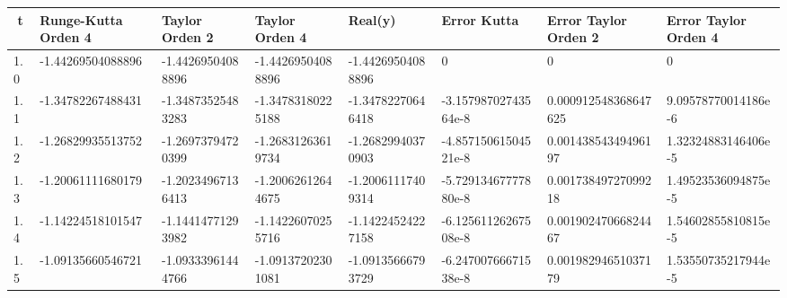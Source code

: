 \documentclass[12pt,b4paper,landscape]{memoir}
\begin{document}
\begin{table}[]

\begin{tabular}{|l|l|l|l|l|l|l|l|}
\hline

\multicolumn{1}{|c|}{\textbf{t}} & \textbf{Runge-Kutta Orden 4} & \textbf{Taylor Orden 2}                 & \textbf{Taylor Orden 4} & \textbf{Real(y)}   & \textbf{Error Kutta} & \textbf{Error Taylor Orden 2} & \textbf{Error Taylor Orden 4} \\ \hline
1.0                                                      & -1.44269504088896            & -1.44269504088896                       & -1.44269504088896       & -1.44269504088896  & 0                    & 0                             & 0                             \\ \hline
1.1                                                      & -1.34782267488431            & -1.34873525483283                       & -1.34783180225188       & -1.34782270646418  & -3.15798702743564e-8  & 0.000912548368647625          & 9.09578770014186e-6           \\ \hline
1.2                                                      & -1.26829935513752            & -1.26973794720399                       & -1.26831263619734       & -1.26829940370903  & -4.85715061504521e-8  & 0.00143854349496197           & 1.32324883146406e-5           \\ \hline
1.3                                                      & -1.20061111680179            & -1.20234967136413                       & -1.20062612644675       & -1.20061117409314  & -5.72913467777880e-8  & 0.00173849727099218           & 1.49523536094875e-5           \\ \hline
1.4                                                      & -1.14224518101547            & -1.14414771293982                       & -1.14226070255716       & -1.14224524227158  & -6.12561126267508e-8   & 0.00190247066824467           & 1.54602855810815e-5           \\ \hline
1.5                                                      & -1.09135660546721           & -1.09333961444766                       & -1.09137202301081       & -1.09135666793729  & -6.24700766671538e-8   & 0.00198294651037179           & 1.53550735217944e-5           \\ \hline

\end{tabular}
\end{table}
\end{document}
